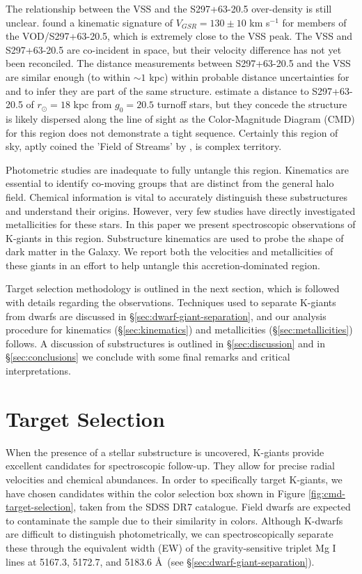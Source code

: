 \documentclass[preprint2]{aastex}
\begin{document}
The relationship between the VSS and the S297+63-20.5 over-density is still unclear. \citet{Newberg;et-al_2007} found a kinematic signature of $V_{GSR} = 130 \pm 10$ km s$^{-1}$ for members of the VOD/S297+63-20.5, which is extremely close to the VSS peak. The VSS and S297+63-20.5 are co-incident in space, but their velocity difference has not yet been reconciled. The distance measurements between S297+63-20.5 and the VSS are similar enough (to within $\sim1$ kpc) within probable distance uncertainties for \citet{Newberg;et-al_2007} and \citet{Prior;et-al_2009a} to infer they are part of the same structure. \citet{Newberg;et-al_2007} estimate a distance to S297+63-20.5 of $r_\odot = 18$ kpc from $g_0 = 20.5$ turnoff stars, but they concede the structure is likely dispersed along the line of sight as the Color-Magnitude Diagram (CMD) for this region does not demonstrate a tight sequence.  Certainly this region of sky, aptly coined the 'Field of Streams' by \citet{Belokurov;et-al_2006}, is complex territory.
	
Photometric studies are inadequate to fully untangle this region. Kinematics are essential to identify co-moving groups that are distinct from the general halo field. Chemical information is vital to accurately distinguish these substructures and understand their origins. However, very few studies have directly investigated metallicities for these stars. In this paper we present spectroscopic observations of K-giants in this region.  Substructure kinematics are used to probe the shape of dark matter in the Galaxy. We report both the velocities and metallicities of these giants in an effort to help untangle this accretion-dominated region.

Target selection methodology is outlined in the next section, which is followed with details regarding the observations. Techniques used to separate K-giants from dwarfs are discussed in \S\ref{sec:dwarf-giant-separation}, and our analysis procedure for kinematics (\S\ref{sec:kinematics}) and metallicities (\S\ref{sec:metallicities}) follows. A discussion of substructures is outlined in \S\ref{sec:discussion} and in \S\ref{sec:conclusions} we conclude with some final remarks and critical interpretations. 
		
\section{Target Selection}
\label{sec:target-selection}
	
When the presence of a stellar substructure is uncovered, K-giants provide excellent candidates for spectroscopic follow-up. They allow for precise radial velocities and chemical abundances. In order to specifically target K-giants, we have chosen candidates within the color selection box shown in Figure \ref{fig:cmd-target-selection}, taken from the SDSS DR7 catalogue. Field dwarfs are expected to contaminate the sample due to their similarity in colors. Although K-dwarfs are difficult to distinguish photometrically, we can spectroscopically separate these through the equivalent width (EW) of the  gravity-sensitive triplet Mg I lines at 5167.3, 5172.7, and 5183.6 \AA\ (see \S\ref{sec:dwarf-giant-separation}).
\end{document}
